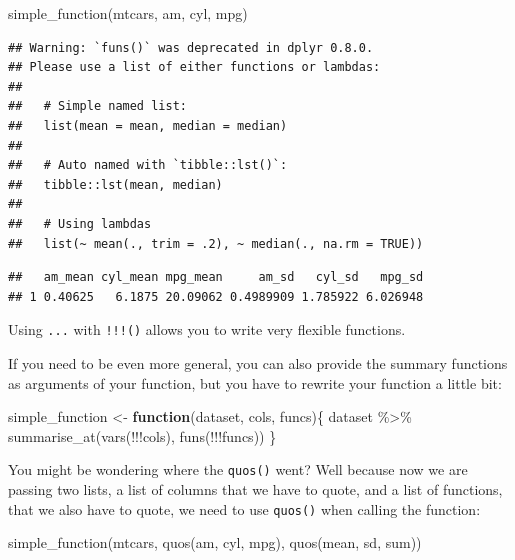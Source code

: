 \documentclass[
]{article}
\newenvironment{Shaded}{\begin{snugshade}}{\end{snugshade}}
\newcommand{\ControlFlowTok}[1]{\textcolor[rgb]{0.13,0.29,0.53}{\textbf{#1}}}
\newcommand{\FunctionTok}[1]{\textcolor[rgb]{0.00,0.00,0.00}{#1}}
\newcommand{\NormalTok}[1]{#1}
\newcommand{\OtherTok}[1]{\textcolor[rgb]{0.56,0.35,0.01}{#1}}
\newcommand{\SpecialCharTok}[1]{\textcolor[rgb]{0.00,0.00,0.00}{#1}}
\begin{document}
\begin{Shaded}
\begin{Highlighting}[]
\FunctionTok{simple\_function}\NormalTok{(mtcars, am, cyl, mpg)}
\end{Highlighting}
\end{Shaded}

\begin{verbatim}
## Warning: `funs()` was deprecated in dplyr 0.8.0.
## Please use a list of either functions or lambdas: 
## 
##   # Simple named list: 
##   list(mean = mean, median = median)
## 
##   # Auto named with `tibble::lst()`: 
##   tibble::lst(mean, median)
## 
##   # Using lambdas
##   list(~ mean(., trim = .2), ~ median(., na.rm = TRUE))
\end{verbatim}

\begin{verbatim}
##   am_mean cyl_mean mpg_mean     am_sd   cyl_sd   mpg_sd
## 1 0.40625   6.1875 20.09062 0.4989909 1.785922 6.026948
\end{verbatim}

Using \texttt{...} with \texttt{!!!()} allows you to write very flexible functions.

If you need to be even more general, you can also provide the summary functions as arguments of
your function, but you have to rewrite your function a little bit:

\begin{Shaded}
\begin{Highlighting}[]
\NormalTok{simple\_function }\OtherTok{\textless{}{-}} \ControlFlowTok{function}\NormalTok{(dataset, cols, funcs)\{}
\NormalTok{  dataset }\SpecialCharTok{\%\textgreater{}\%}
    \FunctionTok{summarise\_at}\NormalTok{(}\FunctionTok{vars}\NormalTok{(}\SpecialCharTok{!!!}\NormalTok{cols), }\FunctionTok{funs}\NormalTok{(}\SpecialCharTok{!!!}\NormalTok{funcs))}
\NormalTok{\}}
\end{Highlighting}
\end{Shaded}

You might be wondering where the \texttt{quos()} went? Well because now we are passing two lists, a list of
columns that we have to quote, and a list of functions, that we also have to quote, we need to use \texttt{quos()}
when calling the function:

\begin{Shaded}
\begin{Highlighting}[]
\FunctionTok{simple\_function}\NormalTok{(mtcars, }\FunctionTok{quos}\NormalTok{(am, cyl, mpg), }\FunctionTok{quos}\NormalTok{(mean, sd, sum))}
\end{Highlighting}
\end{Shaded}
\end{document}
